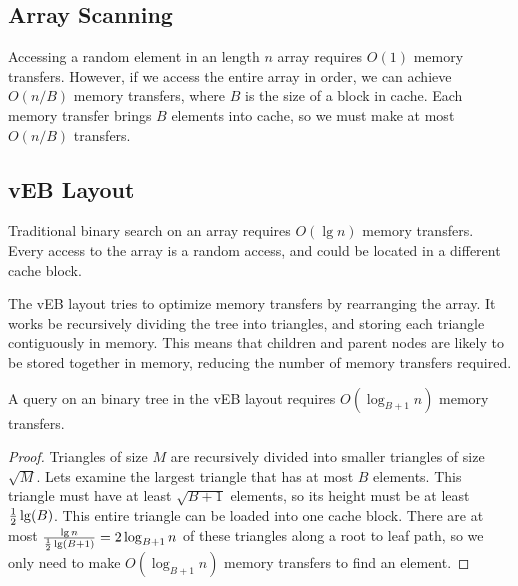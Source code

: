 \subsection*{Array Scanning}
Accessing a random element in an length $n$ array requires $O(1)$ memory
transfers. However, if we access the entire array in order, we can achieve
$O(n/B)$ memory transfers, where $B$ is the size of a block in cache. Each
memory transfer brings $B$ elements into cache, so we must make at most
$O(n/B)$ transfers.

\subsection*{vEB Layout} 
Traditional binary search on an array requires $O(\lg n)$ 
memory transfers. Every access to the array is a random access, and could
be located in a different cache block.

The vEB layout tries to optimize memory transfers by rearranging the array. It
works be recursively dividing the tree into triangles, and storing each
triangle contiguously in memory. This means that children and parent nodes are
likely to be stored together in memory, reducing the number of memory transfers
required.

\begin{lemma} 
A query on an binary tree in the vEB layout requires $O(\log_{B+1} n)$
memory transfers. 
\end{lemma}

\begin{proof} 
Triangles of size $M$ are recursively divided into smaller
triangles of size $\sqrt{M}$. Lets examine the largest triangle that has at most
$B$ elements. This triangle must have at least $\sqrt{B+1}$ elements, so its
height must be at least $\frac{1}{2}\lg \mathopen{}\left(B\right)\mathclose{}$. This entire triangle can be loaded
into one cache block. There are at most 
$\frac{\lg n}{\frac{1}{2}\lg \mathopen{}\left(B+1\right)\mathclose{}} = 2 \log_{B+1} n$ 
of these triangles along a root to leaf path, so we only need to make
$O(\log_{B+1} n)$ memory transfers to find an element. 
\end{proof}



